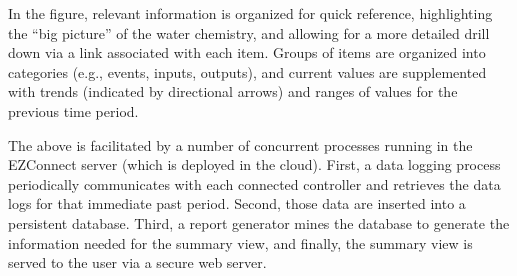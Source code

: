 In the figure, relevant information is organized for quick reference,
highlighting the ``big picture'' of the water chemistry, and allowing for
a more detailed drill down via a link associated with each item.
Groups of items are organized into categories (e.g., events, inputs,
outputs), and current values are supplemented with trends (indicated
by directional arrows) and ranges of values for the previous time period.

The above is facilitated by a number of concurrent processes running
in the EZConnect server (which is deployed in the cloud).  First,
a data logging process periodically communicates with each connected
controller and retrieves the data logs for that immediate past period.
Second, those data are inserted into a persistent database.  Third,
a report generator mines the database to generate the information needed
for the summary view, and finally, the summary view is served to the
user via a secure web server.
